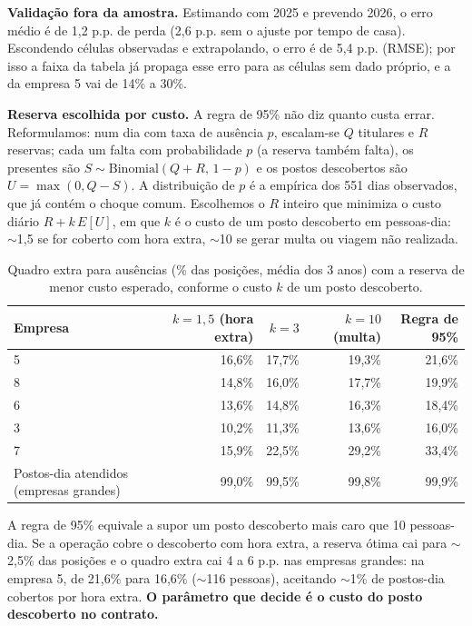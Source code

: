 \documentclass[11pt,a4paper]{article}
\begin{document}
\textbf{Validação fora da amostra.} Estimando com 2025 e prevendo 2026, o erro médio é de 1,2 p.p. de perda (2,6 p.p. sem o ajuste por tempo de casa). Escondendo células observadas e extrapolando, o erro é de 5,4 p.p. (RMSE); por isso a faixa da tabela já propaga esse erro para as células sem dado próprio, e a da empresa 5 vai de 14\% a 30\%.

\textbf{Reserva escolhida por custo.} A regra de 95\% não diz quanto custa errar. Reformulamos: num dia com taxa de ausência $p$, escalam-se $Q$ titulares e $R$ reservas; cada um falta com probabilidade $p$ (a reserva também falta), os presentes são $S\sim\text{Binomial}(Q+R,\,1-p)$ e os postos descobertos são $U=\max(0,Q-S)$. A distribuição de $p$ é a empírica dos 551 dias observados, que já contém o choque comum. Escolhemos o $R$ inteiro que minimiza o custo diário $R + k\,E[U]$, em que $k$ é o custo de um posto descoberto em pessoas-dia: $\sim$1,5 se for coberto com hora extra, $\sim$10 se gerar multa ou viagem não realizada.

\begin{table}[htbp]
\centering\small
\begin{tabular}{lrrrr}
\toprule
Empresa & $k=1{,}5$ (hora extra) & $k=3$ & $k=10$ (multa) & Regra de 95\% \\
\midrule
5 & 16,6\% & 17,7\% & 19,3\% & 21,6\% \\
8 & 14,8\% & 16,0\% & 17,7\% & 19,9\% \\
6 & 13,6\% & 14,8\% & 16,3\% & 18,4\% \\
3 & 10,2\% & 11,3\% & 13,6\% & 16,0\% \\
7 & 15,9\% & 22,5\% & 29,2\% & 33,4\% \\
\midrule
Postos-dia atendidos (empresas grandes) & 99,0\% & 99,5\% & 99,8\% & 99,9\% \\
\bottomrule
\end{tabular}
\caption{Quadro extra para ausências (\% das posições, média dos 3 anos) com a reserva de menor custo esperado, conforme o custo $k$ de um posto descoberto.}
\end{table}

A regra de 95\% equivale a supor um posto descoberto mais caro que 10 pessoas-dia. Se a operação cobre o descoberto com hora extra, a reserva ótima cai para $\sim$2,5\% das posições e o quadro extra cai 4 a 6 p.p. nas empresas grandes: na empresa 5, de 21,6\% para 16,6\% ($\sim$116 pessoas), aceitando $\sim$1\% de postos-dia cobertos por hora extra. \textbf{O parâmetro que decide é o custo do posto descoberto no contrato.}
\end{document}
